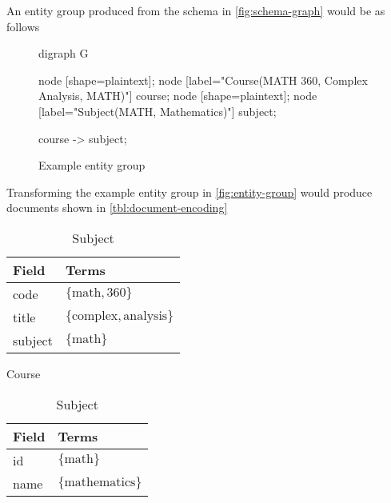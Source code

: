 		\begin{ex}
			An entity group produced from the schema in \vref{fig:schema-graph} would be as follows
			
			\begin{figure}
				\centering
				
				\begin{dot2tex}[dot]
					digraph G {
						node [shape=plaintext]; {node [label="Course(MATH 360, Complex Analysis, MATH)"] course;}
						node [shape=plaintext]; {node [label="Subject(MATH, Mathematics)"] subject;}
						
						course -> subject;
					}
				\end{dot2tex}
				
				\caption{Example entity group}
				\label{fig:entity-group}
			\end{figure}
			
			Transforming the example entity group in \vref{fig:entity-group} would produce documents shown in \vref{tbl:document-encoding}
			
			\begin{table}
				\begin{subtable}[b]{0.33\linewidth}
					\centering
					
					\begin{tabular}{ll}
						\toprule
						Field & Terms \\
						\midrule
						code & \(\{\text{math}, \text{360}\}\) \\
						title & \(\{\text{complex}, \text{analysis}\}\) \\
						subject & \(\{\text{math}\}\) \\
						\bottomrule
					\end{tabular}
					
					\caption{Course}
				\end{subtable}
				\begin{subtable}[b]{0.33\linewidth}
					\centering
					
					\begin{tabular}{ll}
						\toprule
						Field & Terms \\
						\midrule
						id & \(\{\text{math}\}\) \\
						name & \(\{\text{mathematics}\}\) \\
						\bottomrule
					\end{tabular}
					
					\caption{Subject}
				\end{subtable}
				\begin{subtable}[b]{0.33\linewidth}
					\centering
					

\end{subtable}
\end{table}
\end{ex}
